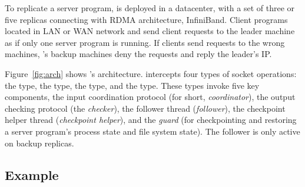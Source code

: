 

To replicate a server program, \xxx is deployed in a datacenter, with a set of 
three or five replicas connecting with RDMA architecture, InfiniBand. Client 
programs located in LAN or WAN network and send client requests to the leader 
machine as if only one server program is running. If clients send requests to 
the wrong machines, \xxx's backup machines deny the requests and reply the 
leader's IP.

Figure~\ref{fig:arch} shows \xxx's architecture. \xxx intercepts four types of 
socket operations: the \accept type, the \recv type, the \send type, and the 
\close type. These types invoke five key components, the input coordination 
protocol (for short, \emph{coordinator}), the output checking protocol (the 
\emph{checker}), the follower thread (\emph{follower}), the checkpoint helper 
thread (\emph{checkpoint helper}), and the \emph{guard} (for checkpointing and 
restoring a server program's process state and file system state). The follower 
is only active on backup replicas.











\subsection{Example}\label{sec:example}


